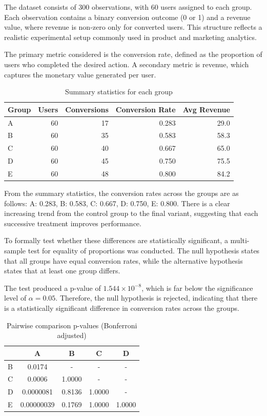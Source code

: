 \documentclass[10pt,a4paper]{article}
\begin{document}
The dataset consists of 300 observations, with 60 users assigned to each group. Each observation contains a binary conversion outcome (0 or 1) and a revenue value, where revenue is non-zero only for converted users. This structure reflects a realistic experimental setup commonly used in product and marketing analytics.

The primary metric considered is the conversion rate, defined as the proportion of users who completed the desired action. A secondary metric is revenue, which captures the monetary value generated per user.

\begin{table}[H]
\centering
\begin{tabular}{lrrrr}
\hline
Group & Users & Conversions & Conversion Rate & Avg Revenue \\
\hline
A & 60 & 17 & 0.283 & 29.0 \\
B & 60 & 35 & 0.583 & 58.3 \\
C & 60 & 40 & 0.667 & 65.0 \\
D & 60 & 45 & 0.750 & 75.5 \\
E & 60 & 48 & 0.800 & 84.2 \\
\hline
\end{tabular}
\caption{Summary statistics for each group}
\end{table}


From the summary statistics, the conversion rates across the groups are as follows:
A: 0.283, B: 0.583, C: 0.667, D: 0.750, E: 0.800.  
There is a clear increasing trend from the control group to the final variant, suggesting that each successive treatment improves performance.

To formally test whether these differences are statistically significant, a multi-sample test for equality of proportions was conducted. The null hypothesis states that all groups have equal conversion rates, while the alternative hypothesis states that at least one group differs.

The test produced a p-value of $1.544 \times 10^{-8}$, which is far below the significance level of $\alpha = 0.05$. Therefore, the null hypothesis is rejected, indicating that there is a statistically significant difference in conversion rates across the groups.

\begin{table}[H]
\centering
\begin{tabular}{lcccc}
\hline
& A & B & C & D \\
\hline
B & 0.0174 & - & - & - \\
C & 0.0006 & 1.0000 & - & - \\
D & 0.0000081 & 0.8136 & 1.0000 & - \\
E & 0.00000039 & 0.1769 & 1.0000 & 1.0000 \\
\hline
\end{tabular}
\caption{Pairwise comparison p-values (Bonferroni adjusted)}
\end{table}
\end{document}
